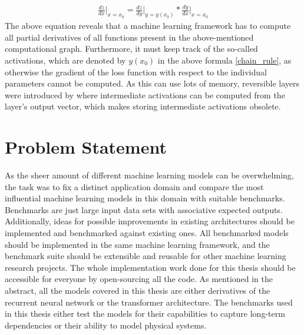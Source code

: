 \documentclass[draft,final]{vutinfth} %
\begin{document}
\begin{align}
\label{chain_rule}
\frac{dz}{dx} \Bigr\rvert_{x=x_0} = \frac{dz}{dy} \Bigr\rvert_{y=y(x_0)} * \frac{dy}{dx} \Bigr\rvert_{x=x_0}
\end{align}
The above equation reveals that a machine learning framework has to compute all partial derivatives of all functions present in the above-mentioned computational graph.
Furthermore, it must keep track of the so-called activations, which are denoted by $y(x_0)$ in the above formula \ref{chain_rule}, as otherwise the gradient of the loss function with respect to the individual parameters cannot be computed.
As this can use lots of memory, reversible layers were introduced by \cite{ReversibleLayer} where intermediate activations can be computed from the layer's output vector, which makes storing intermediate activations obsolete.


\section{Problem Statement}
As the sheer amount of different machine learning models can be overwhelming, the task was to fix a distinct application domain and compare the most influential machine learning models in this domain with suitable benchmarks.
Benchmarks are just large input data sets with associative expected outputs.
Additionally, ideas for possible improvements in existing architectures should be implemented and benchmarked against existing ones.
All benchmarked models should be implemented in the same machine learning framework, and the benchmark suite should be extensible and reusable for other machine learning research projects.
The whole implementation work done for this thesis should be accessible for everyone by open-sourcing all the code.
As mentioned in the abstract, all the models covered in this thesis are either derivatives of the recurrent neural network or the transformer \cite{Transformer} architecture.
The benchmarks used in this thesis either test the models for their capabilities to capture long-term dependencies or their ability to model physical systems.
\end{document}
